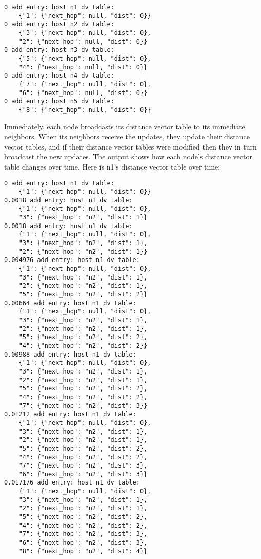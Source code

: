 \documentclass[11pt]{article}
\begin{document}
\begin{lstlisting}
0 add entry: host n1 dv table:
	{"1": {"next_hop": null, "dist": 0}}
0 add entry: host n2 dv table:
	{"3": {"next_hop": null, "dist": 0},
	"2": {"next_hop": null, "dist": 0}}
0 add entry: host n3 dv table:
	{"5": {"next_hop": null, "dist": 0},
	"4": {"next_hop": null, "dist": 0}}
0 add entry: host n4 dv table:
	{"7": {"next_hop": null, "dist": 0},
	"6": {"next_hop": null, "dist": 0}}
0 add entry: host n5 dv table:
	{"8": {"next_hop": null, "dist": 0}}
\end{lstlisting}

Immediately, each node broadcasts its distance vector table to its immediate neighbors. When its neighbors receive the updates, they update their distance vector tables, and if their distance vector tables were modified then they in turn broadcast the new updates. The output shows how each node's distance vector table changes over time. Here is n1's distance vector table over time:

\begin{lstlisting}
0 add entry: host n1 dv table:
	{"1": {"next_hop": null, "dist": 0}}
0.0018 add entry: host n1 dv table:
	{"1": {"next_hop": null, "dist": 0},
	"3": {"next_hop": "n2", "dist": 1}}
0.0018 add entry: host n1 dv table:
	{"1": {"next_hop": null, "dist": 0},
	"3": {"next_hop": "n2", "dist": 1},
	"2": {"next_hop": "n2", "dist": 1}}
0.004976 add entry: host n1 dv table:
	{"1": {"next_hop": null, "dist": 0},
	"3": {"next_hop": "n2", "dist": 1},
	"2": {"next_hop": "n2", "dist": 1},
	"5": {"next_hop": "n2", "dist": 2}}
0.00664 add entry: host n1 dv table:
	{"1": {"next_hop": null, "dist": 0},
	"3": {"next_hop": "n2", "dist": 1},
	"2": {"next_hop": "n2", "dist": 1},
	"5": {"next_hop": "n2", "dist": 2},
	"4": {"next_hop": "n2", "dist": 2}}
0.00988 add entry: host n1 dv table:
	{"1": {"next_hop": null, "dist": 0},
	"3": {"next_hop": "n2", "dist": 1},
	"2": {"next_hop": "n2", "dist": 1},
	"5": {"next_hop": "n2", "dist": 2},
	"4": {"next_hop": "n2", "dist": 2},
	"7": {"next_hop": "n2", "dist": 3}}
0.01212 add entry: host n1 dv table:
	{"1": {"next_hop": null, "dist": 0},
	"3": {"next_hop": "n2", "dist": 1},
	"2": {"next_hop": "n2", "dist": 1},
	"5": {"next_hop": "n2", "dist": 2},
	"4": {"next_hop": "n2", "dist": 2},
	"7": {"next_hop": "n2", "dist": 3},
	"6": {"next_hop": "n2", "dist": 3}}
0.017176 add entry: host n1 dv table:
	{"1": {"next_hop": null, "dist": 0},
	"3": {"next_hop": "n2", "dist": 1},
	"2": {"next_hop": "n2", "dist": 1},
	"5": {"next_hop": "n2", "dist": 2},
	"4": {"next_hop": "n2", "dist": 2},
	"7": {"next_hop": "n2", "dist": 3},
	"6": {"next_hop": "n2", "dist": 3},
	"8": {"next_hop": "n2", "dist": 4}}
\end{lstlisting}
\end{document}
